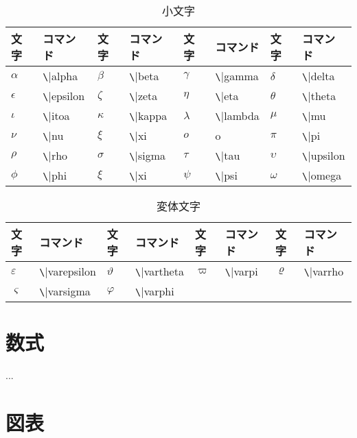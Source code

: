 \documentclass[11pt,a4paper]{jsarticle}
\begin{document}
\begin{table} [ h ]
\caption{小文字}
	\begin{center}
	\begin{tabular}{| l | l || l | l || l | l || l | l |} \hline
		文字 & コマンド & 文字 & コマンド & 文字 & コマンド & 文字 & コマンド \\ \hline
		$\alpha$ & \verb|\|alpha & $\beta$ & \verb|\|beta & $\gamma$ & \verb|\|gamma & $\delta$ & \verb|\|delta \\ \hline
		$\epsilon$ & \verb|\|epsilon & $\zeta$ & \verb|\|zeta & $\eta$ & \verb|\|eta & $\theta$ & \verb|\|theta \\ \hline
		$\iota$ & \verb|\|itoa & $\kappa$ & \verb|\|kappa & $\lambda$ & \verb|\|lambda & $\mu$ & \verb|\|mu \\ \hline
		$\nu$ & \verb|\|nu & $\xi$ & \verb|\|xi & $o$ & o & $\pi$ & \verb|\|pi \\ \hline
		$\rho$ & \verb|\|rho & $\sigma$ & \verb|\|sigma & $\tau$ & \verb|\|tau & $\upsilon$ & \verb|\|upsilon \\ \hline
		$\phi$ & \verb|\|phi & $\xi$ & \verb|\|xi & $\psi$ & \verb|\|psi & $\omega$ & \verb|\|omega \\ \hline
	\end{tabular}
	\end{center}
\end{table}

\begin{table} [ h ]
\caption{変体文字}
	\begin{center}
	\begin{tabular}{| l | l || l | l || l | l || l | l |} \hline
		文字 & コマンド & 文字 & コマンド & 文字 & コマンド & 文字 & コマンド \\ \hline
		$\varepsilon$ & \verb|\|varepsilon & $\vartheta$ & \verb|\|vartheta & $\varpi$ & \verb|\|varpi & $\varrho$ & \verb|\|varrho \\ \hline
		$\varsigma$ & \verb|\|varsigma & $\varphi$ & \verb|\|varphi &  &  &  & \\ \hline
	\end{tabular}
	\end{center}
\end{table}


\section{数式}
...

\section{図表}
\end{document}
